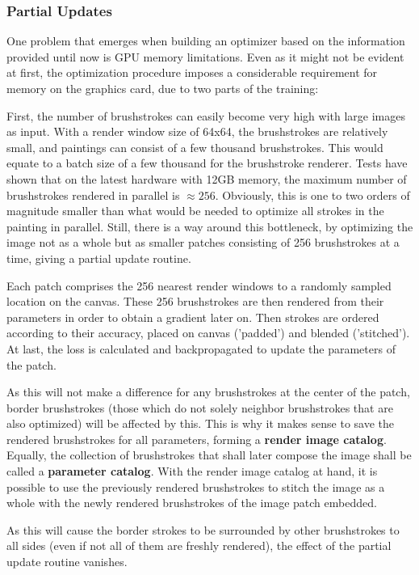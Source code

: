 \subsubsection{Partial Updates}

One problem that emerges when building an optimizer based on the information provided until now is GPU memory limitations.
Even as it might not be evident at first, the optimization procedure imposes a considerable requirement for memory on the graphics card, due to two parts of the training:

First, the number of brushstrokes can easily become very high with large images as input.
With a render window size of 64x64, the brushstrokes are relatively small, and paintings can consist of a few thousand brushstrokes.
This would equate to a batch size of a few thousand for the brushstroke renderer.
Tests have shown that on the latest hardware with 12GB memory, the maximum number of brushstrokes rendered in parallel is $\approx 256$.
Obviously, this is one to two orders of magnitude smaller than what would be needed to optimize all strokes in the painting in parallel.
Still, there is a way around this bottleneck, by optimizing the image not as a whole but as smaller patches consisting of 256 brushstrokes at a time, giving a partial update routine.

Each patch comprises the 256 nearest render windows to a randomly sampled location on the canvas.
These 256 brushstrokes are then rendered from their parameters in order to obtain a gradient later on.
Then strokes are ordered according to their accuracy, placed on canvas ('padded') and blended ('stitched').
At last, the loss is calculated and backpropagated to update the parameters of the patch.

As this will not make a difference for any brushstrokes at the center of the patch, border brushstrokes (those which do not solely neighbor brushstrokes that are also optimized) will be affected by this.
This is why it makes sense to save the rendered brushstrokes for all parameters, forming a \textbf{render image catalog}.
Equally, the collection of brushstrokes that shall later compose the image shall be called a \textbf{parameter catalog}.
With the render image catalog at hand, it is possible to use the previously rendered brushstrokes to stitch the image as a whole with the newly rendered brushstrokes of the image patch embedded.

As this will cause the border strokes to be surrounded by other brushstrokes to all sides (even if not all of them are freshly rendered), the effect of the partial update routine vanishes.

